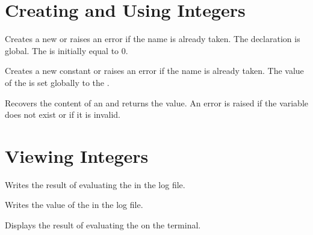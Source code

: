 \documentclass[oneside]{book}
\begin{document}
\section{Creating and Using Integers}

\begin{function}{\IntNew}
\begin{syntax}
 
\end{syntax}
Creates a new  or raises an error if the name is
already taken. The declaration is global. The  is
initially equal to $0$.
\end{function}

\begin{function}{\IntConst}
\begin{syntax}
  
\end{syntax}
Creates a new constant  or raises an error if the name
is already taken. The value of the  is set
globally to the .
\end{function}

\begin{function}{\IntUse}
\begin{syntax}
 
\end{syntax}
Recovers the content of an  and returns the value.
An error is raised if the variable does not exist or if it is invalid.
\end{function}

\section{Viewing Integers}

\begin{function}{\IntLog}
\begin{syntax}
 
\end{syntax}
Writes the result of evaluating the 
in the log file.
\end{function}

\begin{function}{\IntVarLog}
\begin{syntax}
 
\end{syntax}
Writes the value of the  in the log file.
\end{function}

\begin{function}{\IntShow}
\begin{syntax}
 
\end{syntax}
Displays the result of evaluating the 
on the terminal.
\end{function}
\end{document}
